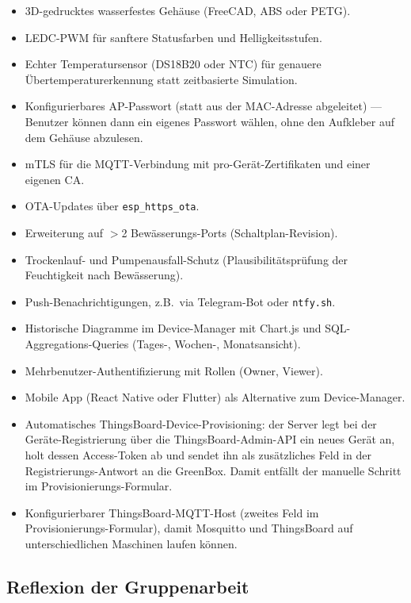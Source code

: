 \documentclass[a4paper,12pt]{article}
\begin{document}
\begin{itemize}
  \item 3D-gedrucktes wasserfestes Gehäuse (FreeCAD, ABS oder PETG).
  \item LEDC-PWM für sanftere Statusfarben und Helligkeitsstufen.
  \item Echter Temperatursensor (DS18B20 oder NTC) für genauere
        Übertemperaturerkennung statt zeitbasierte Simulation.
  \item Konfigurierbares AP-Passwort (statt aus der MAC-Adresse
        abgeleitet) --- Benutzer können dann ein eigenes Passwort
        wählen, ohne den Aufkleber auf dem Gehäuse abzulesen.
  \item mTLS für die MQTT-Verbindung mit pro-Gerät-Zertifikaten und
        einer eigenen CA.
  \item OTA-Updates über \texttt{esp\_https\_ota}.
  \item Erweiterung auf $>$2 Bewässerungs-Ports (Schaltplan-Revision).
  \item Trockenlauf- und Pumpenausfall-Schutz (Plausibilitätsprüfung
        der Feuchtigkeit nach Bewässerung).
  \item Push-Benachrichtigungen, z.B.\ via Telegram-Bot oder
        \texttt{ntfy.sh}.
  \item Historische Diagramme im Device-Manager mit Chart.js und
        SQL-Aggregations-Queries (Tages-, Wochen-, Monatsansicht).
  \item Mehrbenutzer-Authentifizierung mit Rollen (Owner, Viewer).
  \item Mobile App (React Native oder Flutter) als Alternative zum
        Device-Manager.
  \item Automatisches ThingsBoard-Device-Provisioning: der Server
        legt bei der Geräte-Registrierung über die ThingsBoard-Admin-API
        ein neues Gerät an, holt dessen Access-Token ab und sendet
        ihn als zusätzliches Feld in der Registrierungs-Antwort an die
        GreenBox. Damit entfällt der manuelle Schritt im
        Provisionierungs-Formular.
  \item Konfigurierbarer ThingsBoard-MQTT-Host (zweites Feld im
        Provisionierungs-Formular), damit Mosquitto und ThingsBoard
        auf unterschiedlichen Maschinen laufen können.
\end{itemize}

\subsection{Reflexion der Gruppenarbeit}
\end{document}
